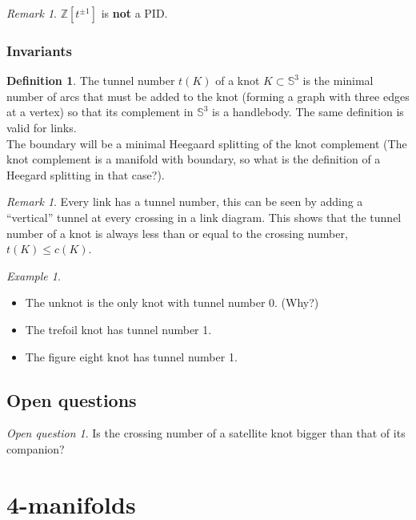 \documentclass[a4paper]{book}
\theoremstyle{definition}
\newtheorem{definition}[theorem]{Definition}
\theoremstyle{remark}
\newtheorem{remark}[theorem]{Remark}
\theoremstyle{example}
\newtheorem{example}[theorem]{Example}
\newtheorem{openquestion}{Open question}
\newcommand{\sphere}[1]{\mathbb{S}^{#1}}
\newcommand{\Z}{\mathbb{Z}}
\begin{document}
\begin{remark}
	$\Z[t^{\pm 1}]$ is \textbf{not} a PID.
\end{remark}


\subsection{Invariants}

\begin{definition}
	The tunnel number $t(K)$ of a knot $K \subset \sphere{3}$ is the minimal number of arcs
	that must be added to the knot (forming a graph with three edges at a vertex) so that
	its complement in $\sphere{3}$ is a handlebody. The same definition is
	valid for links. \\
	The boundary will be a minimal Heegaard splitting of the knot complement
	(The knot complement is a manifold with boundary, so what is the definition
	of a Heegard splitting in that case?).
\end{definition}

\begin{remark}
	Every link has a tunnel number, this can be seen by adding a ``vertical''
	tunnel at every crossing in a link diagram.
	This shows that the tunnel number of a knot is always less than or equal
	to the crossing number, $t(K) \le c(K)$.
\end{remark}

\begin{example}
	\begin{itemize}
		\item The unknot is the only knot with tunnel number 0. (Why?)
		\item The trefoil knot has tunnel number 1.
		\item The figure eight knot has tunnel number 1.
	\end{itemize}
\end{example}

\section{Open questions}

\begin{openquestion}
	Is the crossing number of a satellite knot bigger than that of its companion?
\end{openquestion}
	
\chapter{4-manifolds}

{}


\printindex
\end{document}

